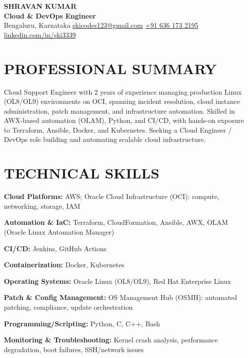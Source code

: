 \documentclass[a4paper,10pt]{extarticle}
\newcommand{\skill}[2]{\textbf{#1:} #2\par}
\begin{document}
\begin{center}
  {\Large\bfseries SHRAVAN KUMAR}\\[3pt]
  \textbf{Cloud \& DevOps Engineer}\\[4pt]
  Bengaluru, Karnataka \textbar{}
  \href{mailto:skicodes123@gmail.com}{skicodes123@gmail.com} \textbar{}
  \href{tel:+916361732195}{+91 636 173 2195} \textbar{}
  \href{https://www.linkedin.com/in/ski3339}{linkedin.com/in/ski3339}
\end{center}

\section*{PROFESSIONAL SUMMARY}
Cloud Support Engineer with 2 years of experience managing production Linux
(OL8/OL9) environments on OCI, spanning incident resolution, cloud instance
administration, patch management, and infrastructure automation. Skilled in
AWX-based automation (OLAM), Python, and CI/CD, with hands-on exposure to
Terraform, Ansible, Docker, and Kubernetes. Seeking a Cloud Engineer / DevOps
role building and automating scalable cloud infrastructure.

\section*{TECHNICAL SKILLS}
\skill{Cloud Platforms}{AWS; Oracle Cloud Infrastructure (OCI): compute, networking, storage, IAM}
\skill{Automation \& IaC}{Terraform, CloudFormation, Ansible, AWX, OLAM (Oracle Linux Automation Manager)}
\skill{CI/CD}{Jenkins, GitHub Actions}
\skill{Containerization}{Docker, Kubernetes}
\skill{Operating Systems}{Oracle Linux (OL8/OL9), Red Hat Enterprise Linux}
\skill{Patch \& Config Management}{OS Management Hub (OSMH): automated patching, compliance, update orchestration}
\skill{Programming/Scripting}{Python, C, C++, Bash}
\skill{Monitoring \& Troubleshooting}{Kernel crash analysis, performance degradation, boot failures, SSH/network issues}
\end{document}
